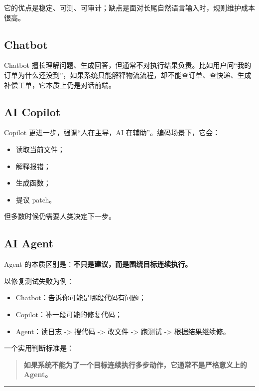 它的优点是稳定、可测、可审计；缺点是面对长尾自然语言输入时，规则维护成本很高。


\subsection{Chatbot}

Chatbot 擅长理解问题、生成回答，但通常不对执行结果负责。比如用户问``我的订单为什么还没到''，如果系统只能解释物流流程，却不能查订单、查快递、生成补偿工单，它本质上仍是对话前端。


\subsection{AI Copilot}

Copilot 更进一步，强调``人在主导，AI 在辅助''。编码场景下，它会：


\begin{itemize}[leftmargin=2em]
\item 读取当前文件；
\item 解释报错；
\item 生成函数；
\item 提议 patch。
\end{itemize}

但多数时候仍需要人类决定下一步。


\subsection{AI Agent}

Agent 的本质区别是：\textbf{不只是建议，而是围绕目标连续执行。}


以修复测试失败为例：


\begin{itemize}[leftmargin=2em]
\item Chatbot：告诉你可能是哪段代码有问题；
\item Copilot：补一段可能的修复代码；
\item Agent：读日志 -> 搜代码 -> 改文件 -> 跑测试 -> 根据结果继续修。
\end{itemize}

一个实用判断标准是：


\begin{quote}
\textbf{如果系统不能为了一个目标连续执行多步动作，它通常不是严格意义上的 Agent。}\\
\end{quote}

\bigskip\hrule\bigskip

